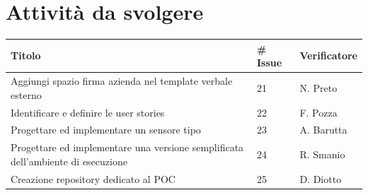 \documentclass{article}
\begin{document}
\section{Attività da svolgere}  %
    \begin{center}
        \begin{tabular}{|C{7cm}|C{1,5cm}|C{3cm}|} 
            \hline
            \textbf{Titolo} & \textbf{\# Issue} & \textbf{Verificatore} \\ \hline\hline
            Aggiungi spazio firma azienda nel template verbale esterno & 21 & N. Preto \\
            Identificare e definire le user stories & 22 & F. Pozza \\
            Progettare ed implementare un sensore tipo & 23 & A. Barutta \\
            Progettare ed implementare una versione semplificata dell'ambiente di esecuzione & 24 & R. Smanio \\
            Creazione repository dedicato al POC & 25 & D. Diotto \\
            \hline
        \end{tabular}
    \end{center}
\end{document}
